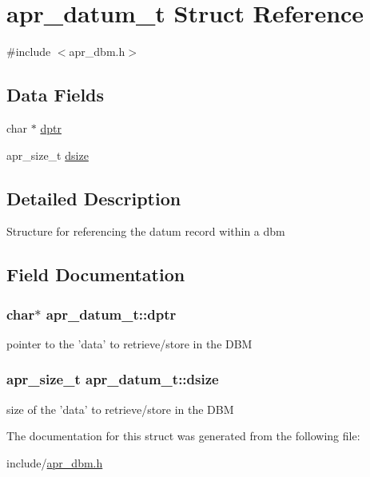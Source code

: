 \hypertarget{structapr__datum__t}{\section{apr\-\_\-datum\-\_\-t Struct Reference}
\label{structapr__datum__t}
}


{\ttfamily \#include $<$apr\-\_\-dbm.\-h$>$}

\subsection*{Data Fields}
\begin{DoxyCompactItemize}
\item 
char $\ast$ \hyperlink{structapr__datum__t_a7f4e0997f26d818c5674446ebb3d58bb}{dptr}
\item 
apr\-\_\-size\-\_\-t \hyperlink{structapr__datum__t_a5b58c23a5f65a8a6e3f8228fef5e429c}{dsize}
\end{DoxyCompactItemize}


\subsection{Detailed Description}
Structure for referencing the datum record within a dbm 

\subsection{Field Documentation}
\hypertarget{structapr__datum__t_a7f4e0997f26d818c5674446ebb3d58bb}{
\subsubsection[{dptr}]{\setlength{\rightskip}{0pt plus 5cm}char$\ast$ apr\-\_\-datum\-\_\-t\-::dptr}}\label{structapr__datum__t_a7f4e0997f26d818c5674446ebb3d58bb}
pointer to the 'data' to retrieve/store in the D\-B\-M \hypertarget{structapr__datum__t_a5b58c23a5f65a8a6e3f8228fef5e429c}{
\subsubsection[{dsize}]{\setlength{\rightskip}{0pt plus 5cm}apr\-\_\-size\-\_\-t apr\-\_\-datum\-\_\-t\-::dsize}}\label{structapr__datum__t_a5b58c23a5f65a8a6e3f8228fef5e429c}
size of the 'data' to retrieve/store in the D\-B\-M 

The documentation for this struct was generated from the following file\-:\begin{DoxyCompactItemize}
\item 
include/\hyperlink{apr__dbm_8h}{apr\-\_\-dbm.\-h}\end{DoxyCompactItemize}
